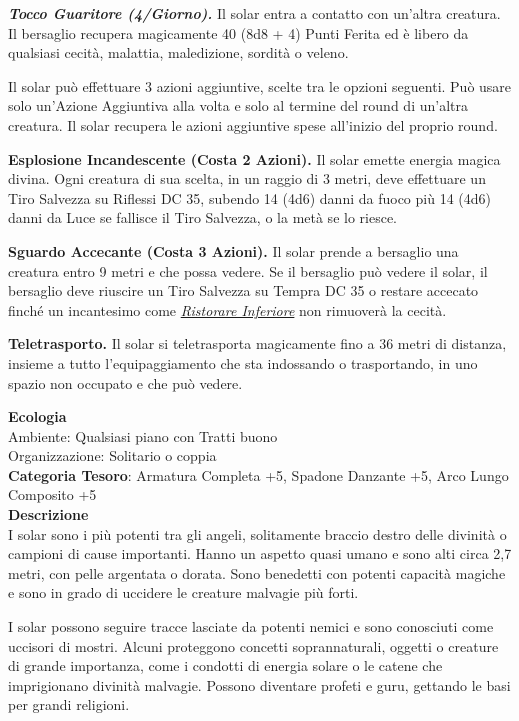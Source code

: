 \begin{multicols}{2}
{\emph{\textbf{Tocco Guaritore (4/Giorno).}} Il solar entra a contatto con un'altra creatura. Il bersaglio recupera magicamente 40 (8d8 + 4) Punti Ferita ed è libero da qualsiasi cecità, malattia, maledizione, sordità o veleno.

Il solar può effettuare 3 azioni aggiuntive, scelte tra le opzioni seguenti. Può usare solo un'Azione Aggiuntiva alla volta e solo al termine del round di un'altra creatura. Il solar recupera le azioni aggiuntive spese all'inizio del proprio round.

\textbf{Esplosione Incandescente (Costa 2 Azioni).} Il solar emette energia magica divina. Ogni creatura di sua scelta, in un raggio di 3 metri, deve effettuare un Tiro Salvezza su Riflessi DC 35, subendo 14 (4d6) danni da fuoco più 14 (4d6) danni da Luce se fallisce il Tiro Salvezza, o la metà se lo riesce.

\textbf{Sguardo Accecante (Costa 3 Azioni).} Il solar prende a bersaglio una creatura entro 9 metri e che possa vedere. Se il bersaglio può vedere il solar, il bersaglio deve riuscire un Tiro Salvezza su Tempra DC 35 o restare accecato finché un incantesimo come \emph{\hyperlink{Ristorare Inferiore}{Ristorare Inferiore}} non rimuoverà la cecità.

\textbf{Teletrasporto.} Il solar si teletrasporta magicamente fino a 36 metri di distanza, insieme a tutto l'equipaggiamento che sta indossando o trasportando, in uno spazio non occupato e che può vedere.

\textbf{Ecologia}\\
Ambiente: Qualsiasi piano con Tratti buono\\
Organizzazione: Solitario o coppia\\
\textbf{Categoria Tesoro}: Armatura Completa +5, Spadone Danzante +5, Arco Lungo Composito +5\\
\textbf{Descrizione}\\
I solar sono i più potenti tra gli angeli, solitamente braccio destro delle divinità o campioni di cause importanti. Hanno un aspetto quasi umano e sono alti circa 2,7 metri, con pelle argentata o dorata. Sono benedetti con potenti capacità magiche e sono in grado di uccidere le creature malvagie più forti.

I solar possono seguire tracce lasciate da potenti nemici e sono conosciuti come uccisori di mostri. Alcuni proteggono concetti soprannaturali, oggetti o creature di grande importanza, come i condotti di energia solare o le catene che imprigionano divinità malvagie. Possono diventare profeti e guru, gettando le basi per grandi religioni.

}
\end{multicols}
